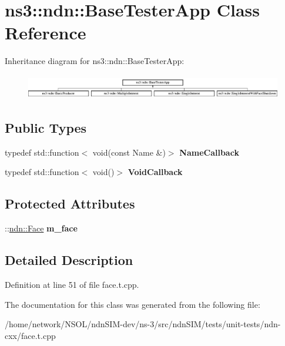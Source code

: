 \hypertarget{classns3_1_1ndn_1_1BaseTesterApp}{}\section{ns3\+:\+:ndn\+:\+:Base\+Tester\+App Class Reference}
\label{classns3_1_1ndn_1_1BaseTesterApp}
Inheritance diagram for ns3\+:\+:ndn\+:\+:Base\+Tester\+App\+:\begin{figure}[H]
\begin{center}
\leavevmode
\includegraphics[height=1.089494cm]{classns3_1_1ndn_1_1BaseTesterApp}
\end{center}
\end{figure}
\subsection*{Public Types}
\begin{DoxyCompactItemize}
\item 
typedef std\+::function$<$ void(const Name \&)$>$ {\bfseries Name\+Callback}\hypertarget{classns3_1_1ndn_1_1BaseTesterApp_aeb5753c7733d720d8a099ff2ea773105}{}\label{classns3_1_1ndn_1_1BaseTesterApp_aeb5753c7733d720d8a099ff2ea773105}

\item 
typedef std\+::function$<$ void()$>$ {\bfseries Void\+Callback}\hypertarget{classns3_1_1ndn_1_1BaseTesterApp_a15b9e4f6b1a6306dff70f6dbc9335fac}{}\label{classns3_1_1ndn_1_1BaseTesterApp_a15b9e4f6b1a6306dff70f6dbc9335fac}

\end{DoxyCompactItemize}
\subsection*{Protected Attributes}
\begin{DoxyCompactItemize}
\item 
\+::\hyperlink{classnfd_1_1Face}{ndn\+::\+Face} {\bfseries m\+\_\+face}\hypertarget{classns3_1_1ndn_1_1BaseTesterApp_a9e88fea86edb0aee5d0396b5fc766a18}{}\label{classns3_1_1ndn_1_1BaseTesterApp_a9e88fea86edb0aee5d0396b5fc766a18}

\end{DoxyCompactItemize}


\subsection{Detailed Description}


Definition at line 51 of file face.\+t.\+cpp.



The documentation for this class was generated from the following file\+:\begin{DoxyCompactItemize}
\item 
/home/network/\+N\+S\+O\+L/ndn\+S\+I\+M-\/dev/ns-\/3/src/ndn\+S\+I\+M/tests/unit-\/tests/ndn-\/cxx/face.\+t.\+cpp\end{DoxyCompactItemize}
